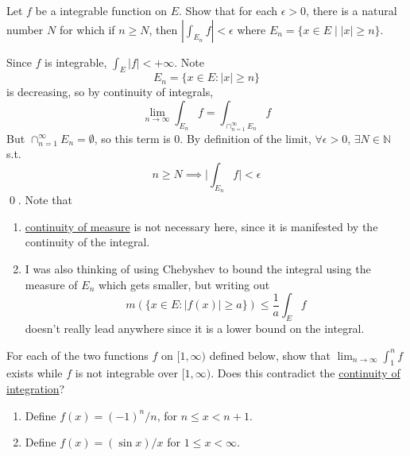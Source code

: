   \begin{exercise}[Royden 4.37]
    Let $f$ be a integrable function on $E$. Show that for each $\epsilon > 0$, there is a natural number $N$ for which if $n \geq N$, then $\left|\int_{E_n} f\right| < \epsilon$ where $E_n = \{x \in E \mid |x| \geq n\}$.
  \end{exercise}
  \begin{solution}
    Since $f$ is integrable, $\int_E |f| < +\infty$. Note 
    \begin{equation}
      E_n = \{x \in E \colon |x| \geq n\}
    \end{equation}
    is decreasing, so by continuity of integrals, 
    \begin{equation}
      \lim_{n \to \infty} \int_{E_n} f = \int_{\cap_{n=1}^\infty E_n} f 
    \end{equation}
    But $\cap_{n=1}^\infty E_n = \emptyset$, so this term is $0$. By definition of the limit, $\forall \epsilon > 0$, $\exists N \in \mathbb{N}$ s.t. 
    \begin{equation}
      n \geq N \implies \bigg| \int_{E_n} f \bigg| < \epsilon
    \end{equation}
    \qed. Note that 
    \begin{enumerate}
      \item \hyperref[thm:continuity-of-measure]{continuity of measure} is not necessary here, since it is manifested by the continuity of the integral. 
      \item I was also thinking of using Chebyshev to bound the integral using the measure of $E_n$ which gets smaller, but writing out 
        \begin{equation}
          m(\{x \in E \colon |f(x)| \geq a \}) \leq \frac{1}{a} \int_E f 
        \end{equation}
        doesn't really lead anywhere since it is a lower bound on the integral. 
    \end{enumerate}
  \end{solution}

  \begin{exercise}[Royden 4.38]
    For each of the two functions $f$ on $[1, \infty)$ defined below, show that $\lim_{n \to \infty} \int_1^n f$ exists while $f$ is not integrable over $[1, \infty)$. Does this contradict the \hyperref[thm:continuity-integration]{continuity of integration}?
    \begin{enumerate}
      \item Define $f(x) = (-1)^n/n$, for $n \leq x < n + 1$.
      \item Define $f(x) = (\sin x)/x$ for $1 \leq x < \infty$.
    \end{enumerate}
  \end{exercise}

